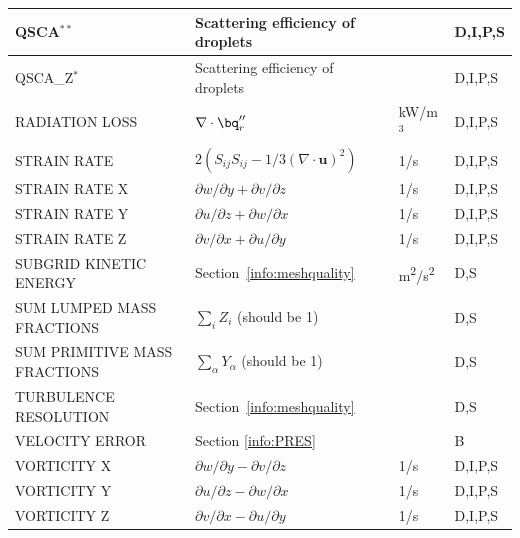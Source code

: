 \documentclass[11pt]{book}
\begin{document}
\begin{longtable}{@{\extracolsep{\fill}}|l|l|l|l|}
{\ct QSCA}$^{**}$                               & Scattering efficiency of droplets                 &                & D,I,P,S      \\ \hline
{\ct QSCA\_Z}$^{*}$                             & Scattering efficiency of droplets                 &                & D,I,P,S      \\ \hline
{\ct RADIATION LOSS}                            & $\nabla \cdot \bq_r''$                            & kW/m$^3$       & D,I,P,S      \\ \hline
{\ct STRAIN RATE}                               & $2(S_{ij}S_{ij}-1/3(\nabla\cdot\mathbf{u})^2)$    & 1/s            & D,I,P,S      \\ \hline
{\ct STRAIN RATE X}                             & $\partial w/\partial y + \partial v/\partial z$   & 1/s            & D,I,P,S      \\ \hline
{\ct STRAIN RATE Y}                             & $\partial u/\partial z + \partial w/\partial x$   & 1/s            & D,I,P,S      \\ \hline
{\ct STRAIN RATE Z}                             & $\partial v/\partial x + \partial u/\partial y$   & 1/s            & D,I,P,S      \\ \hline
{\ct SUBGRID KINETIC ENERGY}                    & Section~\ref{info:meshquality}                    & \si{m^2/s^2}   & D,S          \\ \hline
{\ct SUM LUMPED MASS FRACTIONS}                 & $\sum_i Z_i$ (should be 1)                        &                & D,S          \\ \hline
{\ct SUM PRIMITIVE MASS FRACTIONS}              & $\sum_\alpha Y_\alpha$ (should be 1)              &                & D,S          \\ \hline
{\ct TURBULENCE RESOLUTION}                     & Section~\ref{info:meshquality}                    &                & D,S          \\ \hline
{\ct VELOCITY ERROR}                            & Section \ref{info:PRES}                           &                & B            \\ \hline
{\ct VORTICITY X}                               & $\partial w/\partial y - \partial v/\partial z$   & 1/s            & D,I,P,S      \\ \hline
{\ct VORTICITY Y}                               & $\partial u/\partial z - \partial w/\partial x$   & 1/s            & D,I,P,S      \\ \hline
{\ct VORTICITY Z}                               & $\partial v/\partial x - \partial u/\partial y$   & 1/s            & D,I,P,S      \\ \hline

\end{longtable}
\end{document}
